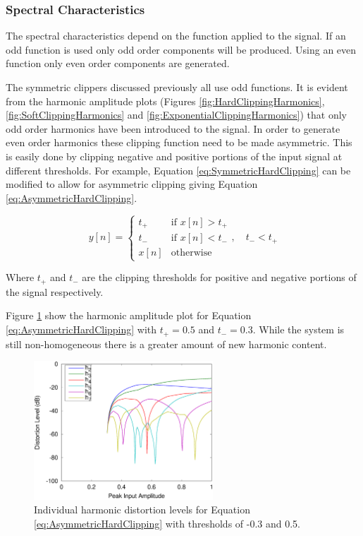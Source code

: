 		\subsubsection*{Spectral Characteristics}
			The spectral characteristics depend on the function applied to the signal. If an odd function is
			used only odd order components will be produced. Using an even function only even order components
			are generated. 

			The symmetric clippers discussed previously all use odd functions. It is evident from the harmonic
			amplitude plots (Figures \ref{fig:HardClippingHarmonics}, \ref{fig:SoftClippingHarmonics} and
			\ref{fig:ExponentialClippingHarmonics}) that only odd order harmonics have been introduced to the
			signal. In order to generate even order harmonics these clipping function need to be made
			asymmetric. This is easily done by clipping negative and positive portions of the input signal at
			different thresholds. For example, Equation \ref{eq:SymmetricHardClipping} can be modified to allow
			for asymmetric clipping giving Equation \ref{eq:AsymmetricHardClipping}.
			
			\begin{equation}
				y[n] = \begin{cases}
					t_{+} & \text{if $x[n] > t_{+}$} \\
					t_{-} & \text{if $x[n] < t_{-}$} \\
					x[n] & \text{otherwise}
				\end{cases}, \quad t_{-} < t_{+}
				\label{eq:AsymmetricHardClipping}
			\end{equation}

			Where $t_{+}$ and $t_{-}$ are the clipping thresholds for positive and negative portions of the
			signal respectively.	

			Figure \ref{fig:AsymmetricHardClippingHarmonics} show the harmonic amplitude plot for Equation
			\ref{eq:AsymmetricHardClipping} with $t_{+} = 0.5$ and $t_{-} = 0.3$. While the system is still
			non-homogeneous there is a greater amount of new harmonic content.

			\begin{figure}[h!]
				\centering
				\includegraphics[width=0.6\textwidth]{chapter3/Images/AsymmetricHardClippingHarmonics.eps}
				\caption{Individual harmonic distortion levels for Equation
					 \ref{eq:AsymmetricHardClipping} with thresholds of -0.3 and 0.5.}
				\label{fig:AsymmetricHardClippingHarmonics}
			\end{figure}

